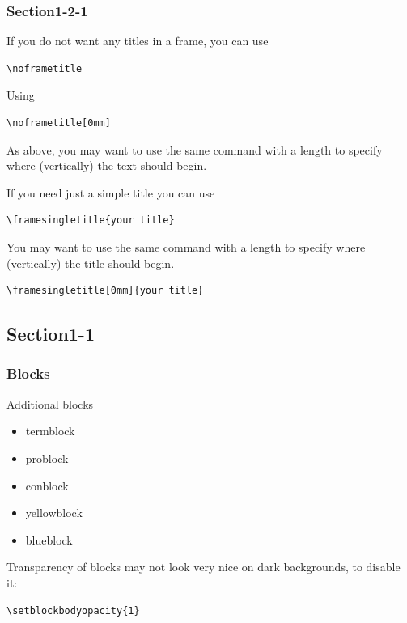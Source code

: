 \documentclass[t,compress,aspectratio=169]{beamer}
\begin{document}
\subsubsection{Section1-2-1}
\begin{frame}[fragile]
\noframetitle
If you do not want any titles in a frame, you can use
\begin{lstlisting}
\noframetitle
\end{lstlisting}
\end{frame}

\begin{frame}[fragile]
\noframetitle[0mm]
Using 
\begin{lstlisting}
\noframetitle[0mm]
\end{lstlisting}

\vskip 5mm
As above, you may want to use the same command with a length to specify where (vertically) the text should begin.
\end{frame}

\begin{frame}[fragile]
If you need just a simple title you can use
\begin{lstlisting}
\framesingletitle{your title}
\end{lstlisting}

\vskip 5mm
You may want to use the same command with a length to specify where (vertically) the title should begin.
\begin{lstlisting}
\framesingletitle[0mm]{your title}
\end{lstlisting}
\end{frame}

\subsection{Section1-1}
\begin{frame}[fragile]
\frametitle{Blocks}
\begin{block}{Additional blocks}
\begin{itemize}
  \item termblock
  \item problock
  \item conblock
  \item yellowblock
  \item blueblock
\end{itemize}
\end{block}
Transparency of blocks may not look very nice on dark backgrounds, to disable it:
\begin{lstlisting}
\setblockbodyopacity{1}
\end{lstlisting}
\end{frame}
\end{document}

